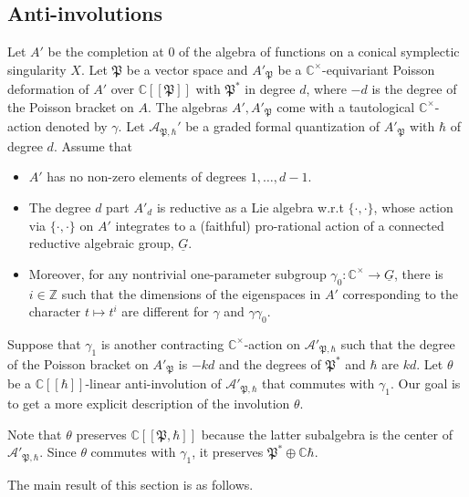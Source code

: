 \documentclass[12pt]{amsart}
\newcommand{\C}{\mathbb{C}}
\newcommand{\A}{\mathcal{A}}
\newcommand{\Z}{\mathbb{Z}}
\newcommand{\param}{\mathfrak{P}}
\theoremstyle{definition}
\numberwithin{equation}{section}
\begin{document}
\subsection{Anti-involutions}
Let $A'$ be the completion at $0$ of the algebra of functions on a conical symplectic
singularity $X$. Let $\param$ be a vector space and $A'_\param$ be a $\C^\times$-equivariant Poisson deformation of $A'$ over $\C[[\param]]$ with $\param^*$ in degree $d$, where $-d$
is the degree of the Poisson bracket on $A$. The algebras $A',A'_\param$ come with a tautological $\C^\times$-action denoted by $\gamma$.
Let $\A_{\param,\hbar}'$ be a graded formal quantization of $A'_\param$
with $\hbar$ of degree $d$. Assume that
\begin{itemize}
\item[(i)] 
$A'$ has no non-zero elements of degrees $1,\ldots,d-1$.
\item[(ii)] The degree $d$ part $A'_d$ is reductive as a  Lie algebra w.r.t $\{\cdot,\cdot\}$, whose action via $\{\cdot,\cdot\}$
on $A'$ integrates to a (faithful) pro-rational action of a connected reductive algebraic group, $\underline{G}$.
\item[(iii)] Moreover, for any nontrivial one-parameter subgroup $\gamma_0:\C^\times\rightarrow \underline{G}$,
there is $i\in \Z$ such that the dimensions of the eigenspaces in $A'$ corresponding to the character $t\mapsto t^i$
are different for $\gamma$ and $\gamma\gamma_0$. 
\end{itemize}

Suppose that $\gamma_1$ is another contracting $\C^\times$-action on $\A'_{\param,\hbar}$
such that the degree of the Poisson bracket on $A'_\param$ is
$-kd$ and the degrees of $\param^*$ and $\hbar$ are $kd$.
Let $\theta$ be a $\C[[\hbar]]$-linear anti-involution of $\A'_{\param,\hbar}$
that commutes with $\gamma_1$. Our goal is to get a more explicit description of the involution $\theta$.

Note that $\theta$ preserves $\C[[\param,\hbar]]$
because the latter subalgebra is the center of $\A'_{\param,\hbar}$. Since $\theta$
commutes with $\gamma_1$, it preserves $\param^*\oplus \C\hbar$.

The main result of this section is as follows.
\end{document}

